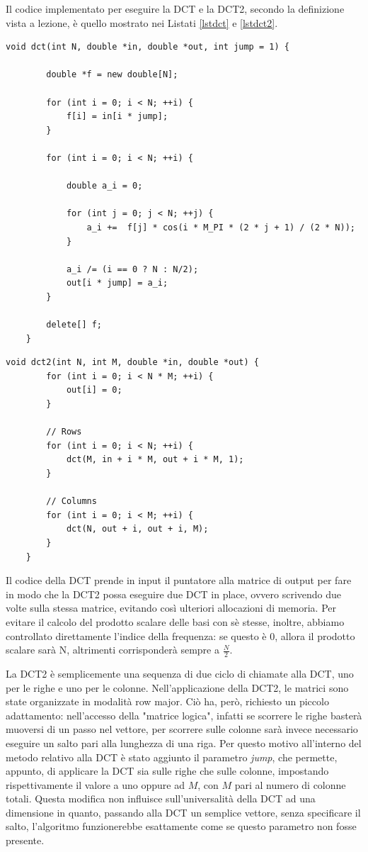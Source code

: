 Il codice implementato per eseguire la DCT e la DCT2, secondo la definizione vista a lezione, è quello mostrato nei Listati \ref{lstdct} e \ref{lstdct2}.


\begin{lstlisting}[gobble=1, float, label=lstdct, caption={Codice per la DCT}]
	void dct(int N, double *in, double *out, int jump = 1) {
		
		double *f = new double[N];
		
		for (int i = 0; i < N; ++i) {
			f[i] = in[i * jump];
		}
		
		for (int i = 0; i < N; ++i) {
			
			double a_i = 0;
			
			for (int j = 0; j < N; ++j) {
				a_i +=  f[j] * cos(i * M_PI * (2 * j + 1) / (2 * N));
			}
			
			a_i /= (i == 0 ? N : N/2);
			out[i * jump] = a_i;
		}
		
		delete[] f;
	}

\end{lstlisting}

\begin{lstlisting}[gobble=1, float, label=lstdct2, caption={Codice per la DCT2}]
	void dct2(int N, int M, double *in, double *out) {
		for (int i = 0; i < N * M; ++i) {
			out[i] = 0;
		}
		
		// Rows
		for (int i = 0; i < N; ++i) {
			dct(M, in + i * M, out + i * M, 1);
		}
		
		// Columns
		for (int i = 0; i < M; ++i) {
			dct(N, out + i, out + i, M);
		}
	}
\end{lstlisting}

Il codice della DCT prende in input il puntatore alla matrice di output per fare in modo che la DCT2 possa eseguire due DCT in place, ovvero scrivendo due volte sulla stessa matrice, evitando così ulteriori allocazioni di memoria.
Per evitare il calcolo del prodotto scalare delle basi con sè stesse, inoltre, abbiamo controllato direttamente l'indice della frequenza: se questo è 0, allora il prodotto scalare sarà N, altrimenti corrisponderà sempre a $\frac{N}{2}$.

La DCT2 è semplicemente una sequenza di due ciclo di chiamate alla DCT, uno per le righe e uno per le colonne.
Nell'applicazione della DCT2, le matrici sono state organizzate in modalità row major. Ciò ha, però, richiesto un piccolo adattamento: nell'accesso della "matrice logica", infatti se scorrere le righe basterà muoversi di un passo nel vettore, per scorrere sulle colonne sarà invece necessario eseguire un salto pari alla lunghezza di una riga. Per questo motivo all'interno del metodo relativo alla DCT è stato aggiunto il parametro \textit{jump}, che permette, appunto, di applicare la DCT sia sulle righe che sulle colonne, impostando rispettivamente il valore a uno oppure ad $M$, con $M$ pari al numero di colonne totali. Questa modifica non influisce sull'universalità della DCT ad una dimensione in quanto, passando alla DCT un semplice vettore, senza specificare il salto, l'algoritmo funzionerebbe esattamente come se questo parametro non fosse presente.

